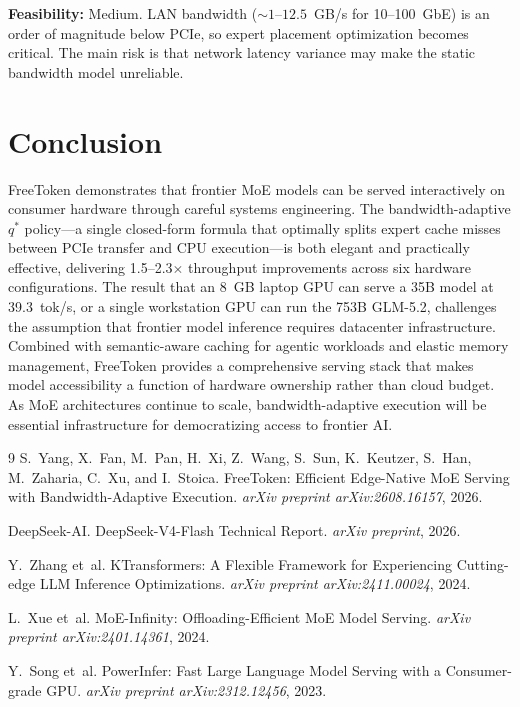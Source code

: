 \documentclass[11pt,a4paper]{article}
\begin{document}
\textbf{Feasibility:} Medium. LAN bandwidth (${\sim}1$--$12.5$~GB/s for 10--100~GbE) is an order of magnitude below PCIe, so expert placement optimization becomes critical. The main risk is that network latency variance may make the static bandwidth model unreliable.

\section{Conclusion}
FreeToken demonstrates that frontier MoE models can be served interactively on consumer hardware through careful systems engineering. The bandwidth-adaptive $q^*$ policy---a single closed-form formula that optimally splits expert cache misses between PCIe transfer and CPU execution---is both elegant and practically effective, delivering 1.5--2.3$\times$ throughput improvements across six hardware configurations. The result that an 8~GB laptop GPU can serve a 35B model at 39.3~tok/s, or a single workstation GPU can run the 753B GLM-5.2, challenges the assumption that frontier model inference requires datacenter infrastructure. Combined with semantic-aware caching for agentic workloads and elastic memory management, FreeToken provides a comprehensive serving stack that makes model accessibility a function of hardware ownership rather than cloud budget. As MoE architectures continue to scale, bandwidth-adaptive execution will be essential infrastructure for democratizing access to frontier AI.

\begin{thebibliography}{9}
S.~Yang, X.~Fan, M.~Pan, H.~Xi, Z.~Wang, S.~Sun, K.~Keutzer, S.~Han, M.~Zaharia, C.~Xu, and I.~Stoica.
\newblock FreeToken: Efficient Edge-Native MoE Serving with Bandwidth-Adaptive Execution.
\newblock \emph{arXiv preprint arXiv:2608.16157}, 2026.

DeepSeek-AI.
\newblock DeepSeek-V4-Flash Technical Report.
\newblock \emph{arXiv preprint}, 2026.

Y.~Zhang et~al.
\newblock KTransformers: A Flexible Framework for Experiencing Cutting-edge LLM Inference Optimizations.
\newblock \emph{arXiv preprint arXiv:2411.00024}, 2024.

L.~Xue et~al.
\newblock MoE-Infinity: Offloading-Efficient MoE Model Serving.
\newblock \emph{arXiv preprint arXiv:2401.14361}, 2024.

Y.~Song et~al.
\newblock PowerInfer: Fast Large Language Model Serving with a Consumer-grade GPU.
\newblock \emph{arXiv preprint arXiv:2312.12456}, 2023.
\end{thebibliography}
\end{document}
